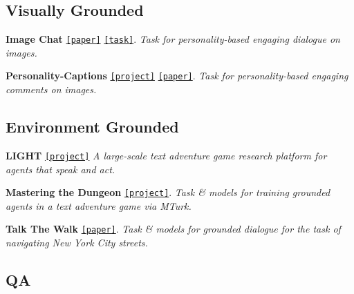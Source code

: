\subsection*{Visually Grounded}


\begin{DoxyItemize}
\item {\bfseries Image Chat} \href{https://klshuster.github.io/image_chat/}{\tt \mbox{[}paper\mbox{]}} \href{https://github.com/facebookresearch/ParlAI/tree/master/parlai/tasks/image_chat}{\tt \mbox{[}task\mbox{]}}. {\itshape Task for personality-\/based engaging dialogue on images.}
\item {\bfseries Personality-\/\+Captions} \href{http://parl.ai/projects/personality_captions/}{\tt \mbox{[}project\mbox{]}} \href{https://arxiv.org/abs/1810.10665}{\tt \mbox{[}paper\mbox{]}}. {\itshape Task for personality-\/based engaging comments on images.}
\end{DoxyItemize}

\subsection*{Environment Grounded}


\begin{DoxyItemize}
\item {\bfseries L\+I\+G\+HT} \href{http://parl.ai/projects/light/}{\tt \mbox{[}project\mbox{]}} {\itshape A large-\/scale text adventure game research platform for agents that speak and act.}
\item {\bfseries Mastering the Dungeon} \href{https://github.com/facebookresearch/ParlAI/tree/master/projects/mastering_the_dungeon}{\tt \mbox{[}project\mbox{]}}. {\itshape Task \& models for training grounded agents in a text adventure game via M\+Turk.}
\item {\bfseries Talk The Walk} \href{https://arxiv.org/abs/1807.03367}{\tt \mbox{[}paper\mbox{]}}. {\itshape Task \& models for grounded dialogue for the task of navigating New York City streets.}
\end{DoxyItemize}

\subsection*{QA}


